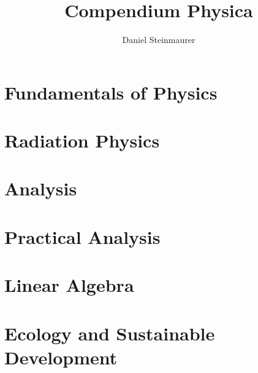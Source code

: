 \documentclass{report}
\title{Compendium Physica}
\author[1]{Daniel Steinmaurer}
\affil{Technische Physik, Technische Universität Wien}
\begin{document}
\maketitle

\newpage
\tableofcontents

\chapter{Fundamentals of Physics}







\chapter{Radiation Physics}



\chapter{Analysis}




\chapter{Practical Analysis}




\chapter{Linear Algebra}



\chapter{Ecology and Sustainable Development}

\end{document}
